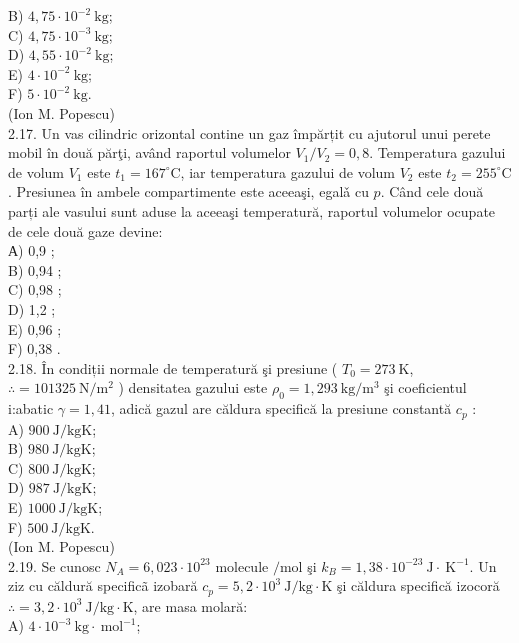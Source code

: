 \documentclass[10pt]{article}
\begin{document}
B) $4,75 \cdot 10^{-2} \mathrm{~kg}$;\\
C) $4,75 \cdot 10^{-3} \mathrm{~kg}$;\\
D) $4,55 \cdot 10^{-2} \mathrm{~kg}$;\\
E) $4 \cdot 10^{-2} \mathrm{~kg}$;\\
F) $5 \cdot 10^{-2} \mathrm{~kg}$.\\
(Ion M. Popescu)\\
2.17. Un vas cilindric orizontal contine un gaz împărțit cu ajutorul unui perete mobil în două părţi, având raportul volumelor $V_{1} / V_{2}=0,8$. Temperatura gazului de volum $V_{1}$ este $t_{1}=167^{\circ} \mathrm{C}$, iar temperatura gazului de volum $V_{2}$ este $t_{2}=255^{\circ} \mathrm{C}$. Presiunea în ambele compartimente este aceeaşi, egalǎ cu $p$. Când cele două parți ale vasului sunt aduse la aceeaşi temperatură, raportul volumelor ocupate de cele două gaze devine:\\
А) 0,9 ;\\
B) 0,94 ;\\
C) 0,98 ;\\
D) 1,2 ;\\
E) 0,96 ;\\
F) 0,38 .\\
2.18. În condiții normale de temperatură şi presiune ( $T_{0}=273 \mathrm{~K}$, $\therefore=101325 \mathrm{~N} / \mathrm{m}^{2}$ ) densitatea gazului este $\rho_{0}=1,293 \mathrm{~kg} / \mathrm{m}^{3}$ şi coeficientul i:abatic $\gamma=1,41$, adică gazul are căldura specifică la presiune constantă $c_{p}$ :\\
A) $900 \mathrm{~J} / \mathrm{kgK}$;\\
B) $980 \mathrm{~J} / \mathrm{kgK}$;\\
C) $800 \mathrm{~J} / \mathrm{kgK}$;\\
D) $987 \mathrm{~J} / \mathrm{kgK}$;\\
E) $1000 \mathrm{~J} / \mathrm{kgK}$;\\
F) $500 \mathrm{~J} / \mathrm{kgK}$.\\
(Ion M. Popescu)\\
2.19. Se cunosc $N_{A}=6,023 \cdot 10^{23}$ molecule $/ \mathrm{mol}$ şi $k_{B}=1,38 \cdot 10^{-23} \mathrm{~J} \cdot \mathrm{~K}^{-1}$. Un ziz cu căldură specificã izobară $c_{p}=5,2 \cdot 10^{3} \mathrm{~J} / \mathrm{kg} \cdot \mathrm{K}$ şi căldura specifică izocoră $\therefore=3,2 \cdot 10^{3} \mathrm{~J} / \mathrm{kg} \cdot \mathrm{K}$, are masa molară:\\
A) $4 \cdot 10^{-3} \mathrm{~kg} \cdot \mathrm{~mol}^{-1}$;\\
\end{document}
